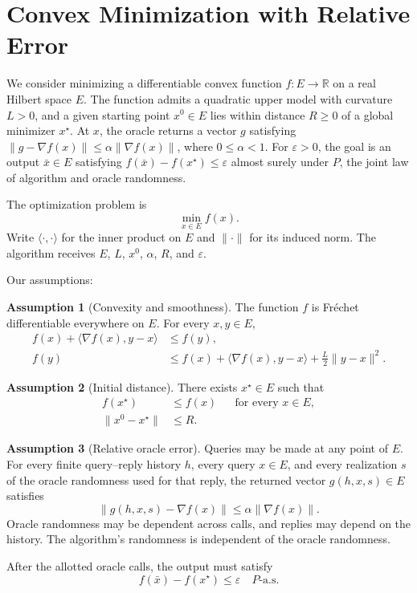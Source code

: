 \documentclass[10pt]{article}
\theoremstyle{definition}
\newtheorem{assumption}{Assumption}
\begin{document}
\section*{Convex Minimization with Relative Error}
We consider minimizing a differentiable convex function $f:E\to\mathbb{R}$ on a real Hilbert space $E$. The function admits a quadratic upper model with curvature $L>0$, and a given starting point $x^0\in E$ lies within distance $R\geq0$ of a global minimizer $x^\star$. At $x$, the oracle returns a vector $g$ satisfying $\|g-\nabla f(x)\|\leq\alpha\|\nabla f(x)\|$, where $0\leq\alpha<1$. For $\varepsilon>0$, the goal is an output $\bar{x}\in E$ satisfying $f(\bar{x})-f(x^\star)\leq\varepsilon$ almost surely under $P$, the joint law of algorithm and oracle randomness.

The optimization problem is
\[
\min_{x\in E} f(x).
\]
Write $\langle\cdot,\cdot\rangle$ for the inner product on $E$ and $\|\cdot\|$ for its induced norm. The algorithm receives $E$, $L$, $x^0$, $\alpha$, $R$, and $\varepsilon$.

Our assumptions:
\begin{assumption}[Convexity and smoothness]
The function $f$ is Fr\'echet differentiable everywhere on $E$. For every $x,y\in E$,
\[
\begin{aligned}
f(x)+\langle\nabla f(x),y-x\rangle
&\leq f(y),\\
f(y)&\leq f(x)+\langle\nabla f(x),y-x\rangle
+\frac{L}{2}\|y-x\|^2.
\end{aligned}
\]
\end{assumption}

\begin{assumption}[Initial distance]
There exists $x^\star\in E$ such that
\[
\begin{aligned}
f(x^\star)&\leq f(x) &&\text{for every }x\in E,\\
\|x^0-x^\star\|&\leq R.
\end{aligned}
\]
\end{assumption}

\begin{assumption}[Relative oracle error]
Queries may be made at any point of $E$. For every finite query--reply history $h$, every query $x\in E$, and every realization $s$ of the oracle randomness used for that reply, the returned vector $g(h,x,s)\in E$ satisfies
\[
\|g(h,x,s)-\nabla f(x)\|
\leq\alpha\|\nabla f(x)\|.
\]
Oracle randomness may be dependent across calls, and replies may depend on the history. The algorithm's randomness is independent of the oracle randomness.
\end{assumption}

After the allotted oracle calls, the output must satisfy
\[
f(\bar{x})-f(x^\star)\leq\varepsilon
\quad P\text{-a.s.}
\]
\end{document}

